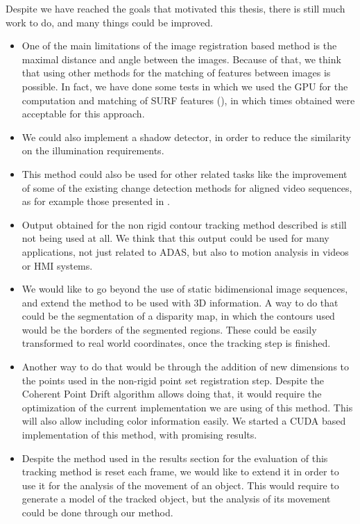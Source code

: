 Despite we have reached the goals that motivated this thesis, there is still much work to do, and many things could be improved. 

\begin{itemize}
 \item One of the main limitations of the image registration based method is the maximal distance and angle between the images. Because of that, we think that using other methods for the matching of features between images is possible. In fact, we have done some tests in which we used the \ac{GPU} for the computation and matching of \ac{SURF} features (\cite{bay2008speeded}), in which times obtained were acceptable for this approach.
 \item We could also implement a shadow detector, in order to reduce the similarity on the illumination requirements.
 \item This method could also be used for other related tasks like the improvement of some of the existing change detection methods for aligned video sequences, as for example those presented in \cite{diego2011video, evangelidis2011slice, evangelidis2011efficient}.
 \item Output obtained for the non rigid contour tracking method described is still not being used at all. We think that this output could be used for many applications, not just related to \ac{ADAS}, but also to motion analysis in videos or \ac{HMI} systems.
 \item We would like to go beyond the use of static bidimensional image sequences, and extend the method to be used with 3D information. A way to do that could be the segmentation of a disparity map, in which the contours used would be the borders of the segmented regions. These could be easily transformed to real world coordinates, once the tracking step is finished.
 \item Another way to do that would be through the addition of new dimensions to the points used in the non-rigid point set registration step. Despite the Coherent Point Drift algorithm allows doing that, it would require the optimization of the current implementation we are using of this method. This will also allow including color information easily. We started a \ac{CUDA} based implementation of this method, with promising results.
 \item Despite the method used in the results section for the evaluation of this tracking method is reset each frame, we would like to extend it in order to use it for the analysis of the movement of an object. This would require to generate a model of the tracked object, but the analysis of its movement could be done through our method.

\end{itemize}
